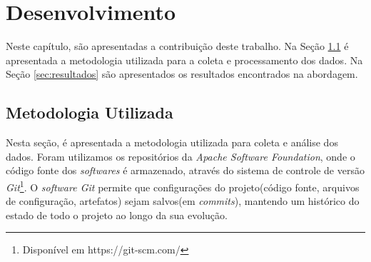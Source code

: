 \chapter{Desenvolvimento}
\label{chapter:desenvolvimento}

Neste capítulo, são apresentadas a contribuição deste trabalho. Na Seção \ref{sec:metodologia} é apresentada a metodologia utilizada para a coleta e processamento dos dados. Na Seção \ref{sec:resultados} são apresentados os resultados encontrados na abordagem.

\section{Metodologia Utilizada} \label{sec:metodologia}

Nesta seção, é apresentada a metodologia utilizada para coleta e análise dos dados. Foram utilizamos os repositórios da \textit{Apache Software Foundation}, onde o código fonte dos \textit{softwares} é armazenado, através do sistema de controle de versão \textit{Git}\footnote{Disponível em https://git-scm.com/}. O \textit{software Git} permite que configurações do projeto(código fonte, arquivos de configuração, artefatos) sejam salvos(em \textit{commits}), mantendo um histórico do estado de todo o projeto ao longo da sua evolução. 

